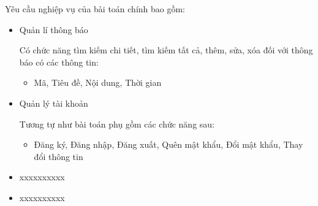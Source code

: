 Yêu cầu nghiệp vụ của bài toán chính bao gồm:

\begin{itemize}

    \item Quản lí thông báo

          Có chức năng tìm kiếm chi tiết, tìm kiếm tất cả, thêm, sửa, xóa đối với thông báo có các thông tin:

          \begin{itemize}

              \item Mã, Tiêu đề, Nội dung, Thời gian

          \end{itemize}

    \item Quản lý tài khoản

          Tương tự như bài toán phụ gồm các chức năng sau:

          \begin{itemize}

              \item Đăng ký, Đăng nhập, Đăng xuất, Quên mật khẩu, Đổi mật khẩu, Thay đổi thông tin

          \end{itemize}

    \item xxxxxxxxxx

    \item xxxxxxxxxx

\end{itemize}















